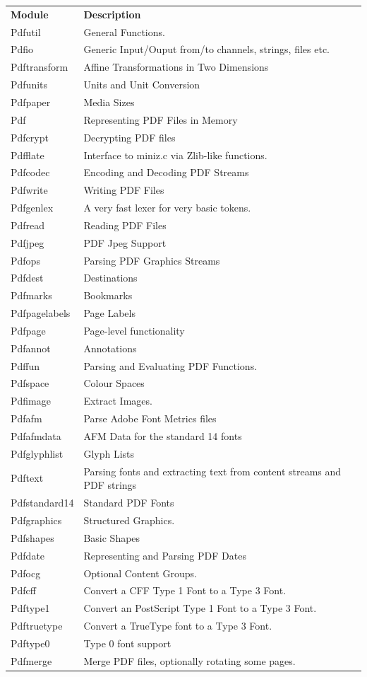 \documentclass[a4paper]{memoir}
\begin{document}
{\centering\small
\begin{tabular}{lp{10cm}l}
  \textbf{Module} & \textbf{Description} \\
Pdfutil &
General Functions. & \\
Pdfio &
Generic Input/Ouput from/to channels, strings, files etc. & \\
Pdftransform &
Affine Transformations in Two Dimensions &  \\
Pdfunits &
Units and Unit Conversion & \\
Pdfpaper &
Media Sizes & \\
Pdf &
Representing PDF Files in Memory & \\
Pdfcrypt &
Decrypting PDF files & \\
Pdfflate &
Interface to miniz.c via Zlib-like functions. & \\
Pdfcodec &
Encoding and Decoding PDF Streams & \\
Pdfwrite &
Writing PDF Files & \\
Pdfgenlex &
A very fast lexer for very basic tokens. & \\
Pdfread &
Reading PDF Files & \\
Pdfjpeg &
PDF Jpeg Support & \\
Pdfops &
Parsing PDF Graphics Streams & \\
Pdfdest &
Destinations & \\
Pdfmarks &
Bookmarks & \\
Pdfpagelabels &
Page Labels & \\
Pdfpage &
Page-level functionality & \\
Pdfannot &
Annotations & \\
Pdffun &
Parsing and Evaluating PDF Functions. & \\
Pdfspace &
Colour Spaces & \\
Pdfimage &
Extract Images. & \\
Pdfafm &
Parse Adobe Font Metrics files & \\
Pdfafmdata &
AFM Data for the standard 14 fonts & \\ 
Pdfglyphlist &
Glyph Lists & \\
Pdftext &
Parsing fonts and extracting text from content streams and PDF strings & \\
Pdfstandard14 &
Standard PDF Fonts & \\
Pdfgraphics &
Structured Graphics. & \\
Pdfshapes &
Basic Shapes & \\
Pdfdate &
Representing and Parsing PDF Dates & \\
Pdfocg &
Optional Content Groups. & \\
Pdfcff &
Convert a CFF Type 1 Font to a Type 3 Font. & \\
Pdftype1 &
Convert an PostScript Type 1 Font to a Type 3 Font. & \\
Pdftruetype &
Convert a TrueType font to a Type 3 Font. & \\
Pdftype0 &
Type 0 font support & \\
Pdfmerge &
Merge PDF files, optionally rotating some pages. 
 \end{tabular}
}
\end{document}
